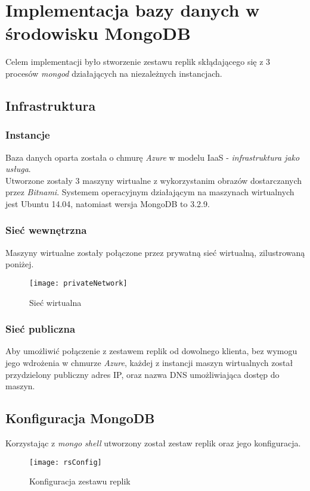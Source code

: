 \section{Implementacja bazy danych w środowisku MongoDB}
Celem implementacji było stworzenie zestawu replik skłądającego się z 3 procesów \textit{mongod} działających na niezależnych instancjach. 

\subsection{Infrastruktura}
\subsubsection{Instancje}
Baza danych oparta została o chmurę \textit{Azure} w modelu IaaS - \textit{infrastruktura jako usługa}.\\
Utworzone zostały 3 maszyny wirtualne z wykorzystanim obrazów dostarczanych przez \textit{Bitnami}. Systemem operacyjnym działającym na maszynach wirtualnych jest Ubuntu 14.04, natomiast wersja MongoDB to 3.2.9. \\

\subsubsection{Sieć wewnętrzna}
Maszyny wirtualne zostały połączone przez prywatną sieć wirtualną, zilustrowaną poniżej. 

\begin{figure}[H]
	\centering
	\texttt{[image: privateNetwork]}
	\caption{Sieć wirtualna}
\end{figure}

\subsubsection{Sieć publiczna}
Aby umożliwić połączenie z zestawem replik od dowolnego klienta, bez wymogu jego wdrożenia w chmurze \textit{Azure}, każdej z instancji maszyn wirtualnych został przydzielony publiczny adres IP, oraz nazwa DNS umożliwiająca dostęp do maszyn.

\subsection{Konfiguracja MongoDB}
Korzystając z \textit{mongo shell} utworzony został zestaw replik oraz jego konfiguracja. 

\begin{figure}[H]
	\centering
	\texttt{[image: rsConfig]}
	\caption{Konfiguracja zestawu replik}
\end{figure}

